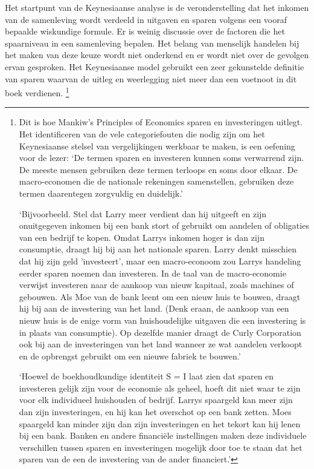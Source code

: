 \documentclass[
  a5paper,
  smalldemyvopaper,11pt,twoside,onecolumn,openright,extrafontsizes,
hidelinks]{memoir}
\begin{document}
Het startpunt van de Keynesiaanse analyse is de veronderstelling dat het
inkomen van de samenleving wordt verdeeld in uitgaven en sparen volgens
een vooraf bepaalde wiskundige formule. Er is weinig discussie over de
factoren die het spaarniveau in een samenleving bepalen. Het belang van
menselijk handelen bij het maken van deze keuze wordt niet onderkend en
er wordt niet over de gevolgen ervan gesproken. Het Keynesiaanse model
gebruikt een zeer gekunstelde definitie van sparen waarvan de uitleg en
weerlegging niet meer dan een voetnoot in dit boek verdienen.
\footnote{Dit is hoe Mankiw's Principles of Economics sparen en
  investeringen uitlegt. Het identificeren van de vele categoriefouten
  die nodig zijn om het Keynesiaanse stelsel van vergelijkingen werkbaar
  te maken, is een oefening voor de lezer: `De termen sparen en
  investeren kunnen soms verwarrend zijn. De meeste mensen gebruiken
  deze termen terloops en soms door elkaar. De macro-economen die de
  nationale rekeningen samenstellen, gebruiken deze termen daarentegen
  zorgvuldig en duidelijk.'

  `Bijvoorbeeld. Stel dat Larry meer verdient dan hij uitgeeft en zijn
  onuitgegeven inkomen bij een bank stort of gebruikt om aandelen of
  obligaties van een bedrijf te kopen. Omdat Larrys inkomen hoger is dan
  zijn consumptie, draagt hij bij aan het nationale sparen. Larry denkt
  misschien dat hij zijn geld 'investeert', maar een macro-econoom zou
  Larrys handeling eerder sparen noemen dan investeren. In de taal van
  de macro-economie verwijst investeren naar de aankoop van nieuw
  kapitaal, zoals machines of gebouwen. Als Moe van de bank leent om een
  nieuw huis te bouwen, draagt hij bij aan de investering van het land.
  (Denk eraan, de aankoop van een nieuw huis is de enige vorm van
  huishoudelijke uitgaven die een investering is in plaats van
  consumptie). Op dezelfde manier draagt de Curly Corporation ook bij
  aan de investeringen van het land wanneer ze wat aandelen verkoopt en
  de opbrengst gebruikt om een nieuwe fabriek te bouwen.'

  `Hoewel de boekhoudkundige identiteit S = I laat zien dat sparen en
  investeren gelijk zijn voor de economie als geheel, hoeft dit niet
  waar te zijn voor elk individueel huishouden of bedrijf. Larrys
  spaargeld kan meer zijn dan zijn investeringen, en hij kan het
  overschot op een bank zetten. Moes spaargeld kan minder zijn dan zijn
  investeringen en het tekort kan hij lenen bij een bank. Banken en
  andere financiële instellingen maken deze individuele verschillen
  tussen sparen en investeringen mogelijk door toe te staan dat het
  sparen van de een de investering van de ander financiert.'}
\end{document}
